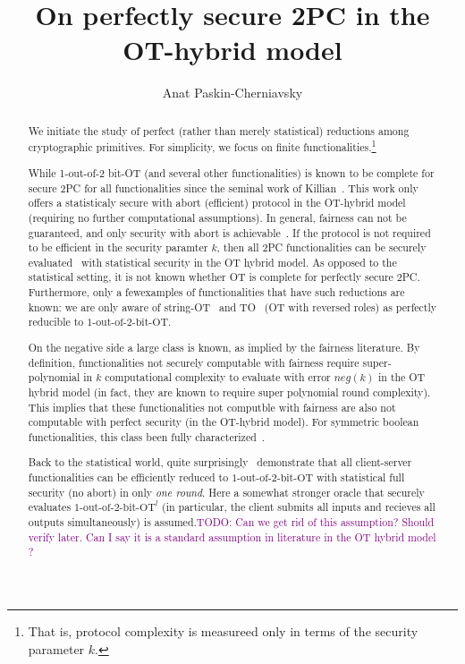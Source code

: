 \documentclass[a4paper]{article}
\title{On perfectly secure 2PC in the OT-hybrid model}
\author{Anat Paskin-Cherniavsky}
\newcommand{\OT}[2]{#1\text{-out-of-}#2\text{-bit-OT}}
\newcommand{\atodo}[1]{\textcolor{purple}{TODO: #1}}
\begin{document}
\maketitle

\begin{abstract}
We initiate the study of perfect (rather than merely statistical) reductions among cryptographic primitives. For simplicity, we focus on finite functionalities.\footnote{That is, protocol complexity is measureed only in terms of the security parameter $k$.}


While 1-out-of-2 bit-OT (and several other functionalities) is known to be complete for secure 2PC for all functionalities since the seminal work of Killian~\cite{Killian88}. This work only offers a statisticaly secure with abort (efficient) protocol in the OT-hybrid model (requiring no further computational assumptions). In general, fairness can not be guaranteed, and only security with abort is achievable~\cite{Cleve86}. If the protocol is not required to be efficient in the security paramter $k$, then all 2PC functionalities can be securely evaluated~\cite{GK10} with statistical security in the OT hybrid model.
As opposed to the statistical setting, it is not known whether OT is complete for perfectly secure 2PC. Furthermore, only a fewexamples of functionalities that have such reductions are known: we are only aware of string-OT~\cite{BCS96} and TO~\cite{WolfW06} (OT with reversed roles) as perfectly reducible to $\OT{1}{2}$.

On the negative side a large class is known, as implied by the fairness literature. By definition, functionalities not securely computable with fairness require super-polynomial in $k$ 
computational complexity to evaluate with error $neg(k)$ in the OT hybrid model (in fact, they are known to require super polynomial round complexity). 
This implies that these functionalities not computble with fairness are also not computable with perfect security (in the OT-hybrid model). For symmetric boolean functionalities, this class been fully characterized~\cite{}.

Back to the statistical world, quite surprisingly~\cite{IKOPS11} demonstrate that all client-server functionalities can be efficiently reduced to $\OT{1}{2}$ with statistical full security (no abort) in only \emph{one round}. Here a somewhat stronger oracle that securely evaluates ${\OT{1}{2}}^l$ (in particular, the client submits all inputs and recieves all outputs simultaneously) is assumed.\atodo{Can we get rid of this assumption? Should verify later. Can I say it is a standard assumption in literature in the OT hybrid model ?}


\end{abstract}
\end{document}
